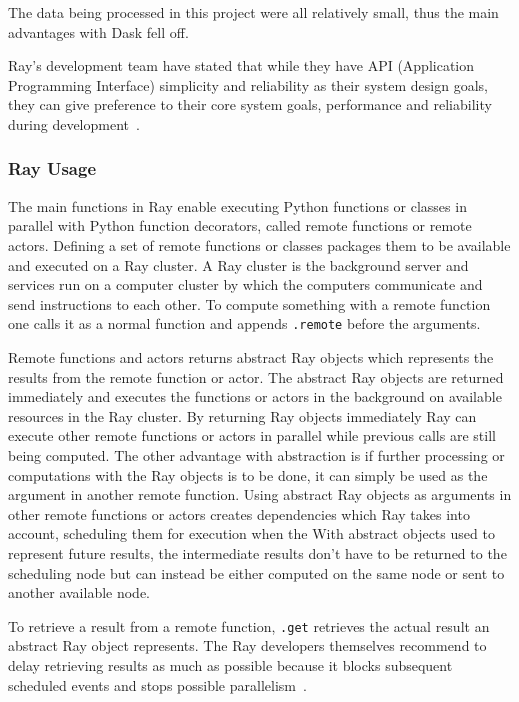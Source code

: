 \documentclass[12pt, a4paper]{article}
\begin{document}
The data being processed in this project were all relatively small, thus the main advantages with Dask fell off.

Ray's development team have stated that while they have API (Application Programming Interface) simplicity and reliability as their system design goals, they can give preference to their core system goals, performance and reliability during development~\cite{ray:Architecture}.


\subsubsection{Ray Usage}

The main functions in Ray enable executing Python functions or classes in parallel with Python function decorators, called remote functions or remote actors.
Defining a set of remote functions or classes packages them to be available and executed on a Ray cluster.
A Ray cluster is the background server and services run on a computer cluster by which the computers communicate and send instructions to each other.
To compute something with a remote function one calls it as a normal function and appends \texttt{.remote} before the arguments. 

Remote functions and actors returns abstract Ray objects which represents the results from the remote function or actor.
The abstract Ray objects are returned immediately and executes the functions or actors in the background on available resources in the Ray cluster.
By returning Ray objects immediately Ray can execute other remote functions or actors in parallel while previous calls are still being computed. 
The other advantage with abstraction is if further processing or computations with the Ray objects is to be done, it can simply be used as the argument in another remote function.
Using abstract Ray objects as arguments in other remote functions or actors creates dependencies which Ray takes into account, scheduling them for execution when the 
With abstract objects used to represent future results, the intermediate results don't have to be returned to the scheduling node but can instead be either computed on the same node or sent to another available node.

To retrieve a result from a remote function, \texttt{.get} retrieves the actual result an abstract Ray object represents.
The Ray developers themselves recommend to delay retrieving results as much as possible because it blocks subsequent scheduled events and stops possible parallelism~\cite{ray:delayget}.
\end{document}
